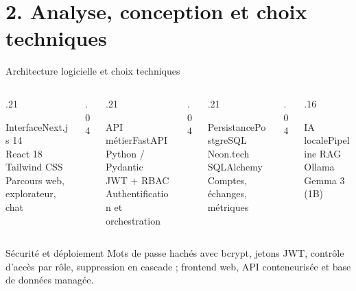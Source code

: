 \documentclass[aspectratio=169,10pt]{beamer}
\begin{document}
\section{2. Analyse, conception et choix techniques}
\begin{frame}{Architecture logicielle et choix techniques}
  \begin{columns}[T,onlytextwidth]
    \begin{column}{.21\textwidth}\begin{block}{Interface}\centering Next.js 14\\React 18\\Tailwind CSS\\\small Parcours web, explorateur, chat\end{block}\end{column}
    \begin{column}{.04\textwidth}\centering\vspace{1.2cm}{\large\color{gold}$\rightarrow$}\end{column}
    \begin{column}{.21\textwidth}\begin{block}{API métier}\centering FastAPI\\Python / Pydantic\\JWT + RBAC\\\small Authentification et orchestration\end{block}\end{column}
    \begin{column}{.04\textwidth}\centering\vspace{1.2cm}{\large\color{gold}$\rightarrow$}\end{column}
    \begin{column}{.21\textwidth}\begin{block}{Persistance}\centering PostgreSQL\\Neon.tech\\SQLAlchemy\\\small Comptes, échanges, métriques\end{block}\end{column}
    \begin{column}{.04\textwidth}\centering\vspace{1.2cm}{\large\color{gold}$\rightarrow$}\end{column}
    \begin{column}{.16\textwidth}\begin{block}{IA locale}\centering Pipeline RAG\\Ollama\\Gemma 3 (1B)\end{block}\end{column}
  \end{columns}
  \vspace{0.35cm}
  \begin{block}{Sécurité et déploiement}
    Mots de passe hachés avec bcrypt, jetons JWT, contrôle d'accès par rôle, suppression en cascade ; frontend web, API conteneurisée et base de données managée.
  \end{block}
\end{frame}
\end{document}
